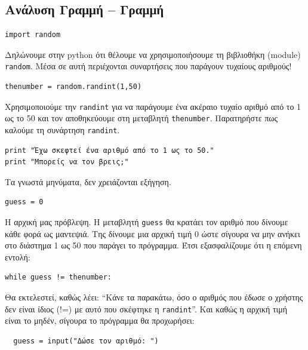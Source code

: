 \subsection{Ανάλυση Γραμμή -- Γραμμή}
%
\begin{verbatim}
import random
\end{verbatim}

Δηλώνουμε στην python ότι θέλουμε να χρησιμοποιήσουμε τη βιβλιοθήκη (module)
{\tt random}. Μέσα σε αυτή περιέχονται συναρτήσεις που παράγουν τυχαίους αριθμούς!

\begin{verbatim}
thenumber = random.randint(1,50)
\end{verbatim}

Χρησιμοποιούμε την {\tt randint} για να παράγουμε ένα ακέραιο τυχαίο αριθμό
από το 1 ως το 50 και τον αποθηκεύουμε στη μεταβλητή {\tt thenumber}.
Παρατηρήστε πως καλούμε τη συνάρτηση {\tt randint}.

\begin{verbatim}
print "Έχω σκεφτεί ένα αριθμό από το 1 ως το 50."
print "Μπορείς να τον βρεις;"
\end{verbatim}

Τα γνωστά μηνύματα, δεν χρειάζονται εξήγηση.

\begin{verbatim}
guess = 0
\end{verbatim}

Η αρχική μας πρόβλεψη. Η μεταβλητή {\tt guess} θα κρατάει τον αριθμό που
δίνουμε κάθε φορά ως μαντεψιά. Της δίνουμε μια αρχική τιμή 0 ώστε σίγουρα
να μην ανήκει στο διάστημα 1 ως 50 που παράγει το πρόγραμμα. Έτσι
εξασφαλίζουμε ότι η επόμενη εντολή:

\begin{verbatim}
while guess != thenumber:
\end{verbatim}

Θα εκτελεστεί, καθώς λέει: ``Κάνε τα παρακάτω, όσο ο αριθμός που έδωσε ο
χρήστης δεν είναι ίδιος (!=) με αυτό που σκέφτηκε η {\tt randint}''. Και καθώς η
αρχική τιμή είναι το μηδέν, σίγουρα το πρόγραμμα θα προχωρήσει:

\begin{verbatim}
  guess = input("Δώσε τον αριθμό: ")
\end{verbatim}

